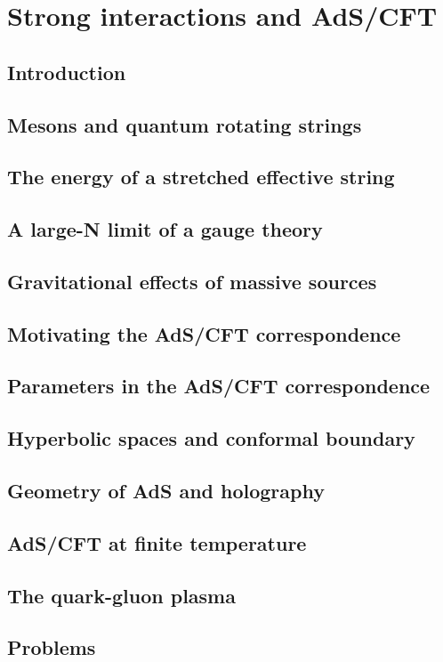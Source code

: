 \documentclass[12pt]{report}
\begin{document}
\chapter{Strong interactions and AdS/CFT}
\newpage
\section{Introduction}
\section{Mesons and quantum rotating strings}
\section{The energy of a stretched effective string}
\section{A large-N limit of a gauge theory}
\section{Gravitational effects of massive sources}
\section{Motivating the AdS/CFT correspondence}
\section{Parameters in the AdS/CFT correspondence}
\section{Hyperbolic spaces and conformal boundary}
\section{Geometry of AdS and holography}
\section{AdS/CFT at finite temperature}
\section{The quark-gluon plasma}
\section{Problems}
\end{document}
